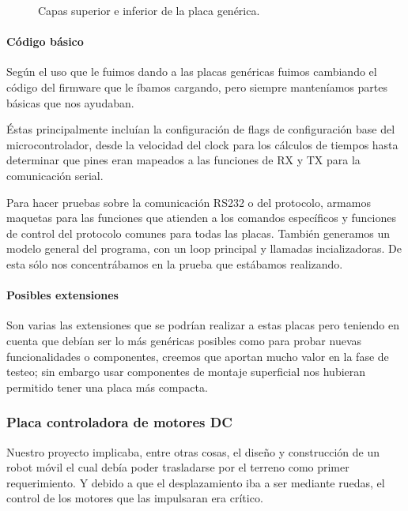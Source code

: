 \begin{figure}
	\caption{Capas superior e inferior de la placa gen\'erica.}
	\label{hF_placa_gen_capas}
\end{figure}

\paragraph{C\'odigo b\'asico}
\label{h_placas_generica_codigo}

Seg\'un el uso que le fuimos dando a las placas gen\'ericas fuimos cambiando el c\'odigo del firmware que le
\'ibamos cargando, pero siempre manten\'iamos partes b\'asicas que nos ayudaban.

\'Estas principalmente inclu\'ian la configuraci\'on de flags de configuraci\'on base del microcontrolador,
desde la velocidad del clock para los c\'alculos de tiempos hasta determinar que pines eran mapeados a las
funciones de RX y TX para la comunicaci\'on serial.

Para hacer pruebas sobre la comunicaci\'on RS232 o del protocolo, armamos maquetas para las funciones que
atienden a los comandos espec\'ificos y funciones de control del protocolo comunes para todas las placas.
Tambi\'en generamos un modelo general del programa, con un loop principal y llamadas incializadoras.
De esta s\'olo nos concentr\'abamos en la prueba que est\'abamos realizando.

\paragraph{Posibles extensiones}
\label{h_placas_generica_extensiones}

Son varias las extensiones que se podr\'ian realizar a estas placas pero teniendo en cuenta que deb\'ian ser
lo m\'as gen\'ericas posibles como para probar nuevas funcionalidades o componentes, creemos que aportan mucho
valor en la fase de testeo; sin embargo usar componentes de montaje superficial nos hubieran permitido tener
una placa m\'as compacta.

\subsubsection{Placa controladora de motores DC}
\label{h_placas_motorDC}

Nuestro proyecto implicaba, entre otras cosas, el dise\~no y construcci\'on de un robot m\'ovil el cual deb\'ia poder
trasladarse por el terreno como primer requerimiento.
Y debido a que el desplazamiento iba a ser mediante ruedas, el control de los motores que las impulsaran era cr\'itico.

